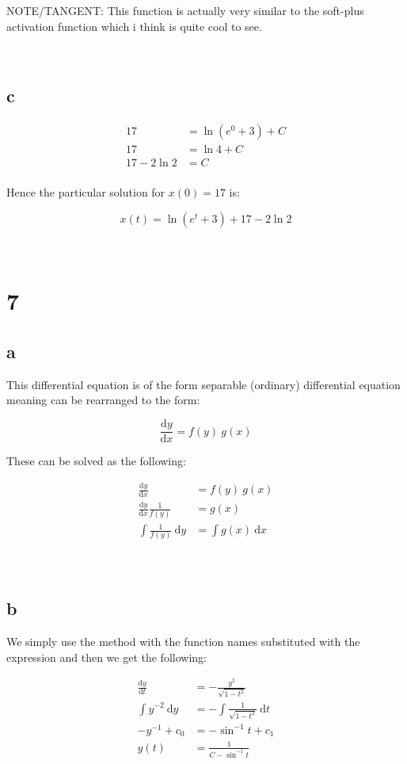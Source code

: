 \documentclass{article}
\newcommand{\md}{~\mathrm d}
\newcommand{\Md}{\mathrm d}
\newcommand{\blankpage}{
    \newpage
    \
    \newpage
}
\begin{document}
\begin{center}
    NOTE/TANGENT: This function is actually very similar to the soft-plus activation function which i think is quite cool to see.
\end{center}

\blankpage
\subsection{c}

\begin{align*}
    17 &= \ln (e^0 + 3) + C \\
    17 &= \ln 4 + C \\
    17 - 2\ln 2 &= C \\
\end{align*}

Hence the particular solution for $x(0) = 17$ is:

$$x(t) = \ln(e^t + 3) + 17 - 2 \ln 2$$

\blankpage
\section{7}
\subsection{a}

This differential equation is of the form separable (ordinary) differential equation meaning can be rearranged to the form:

$$\frac{\Md y}{\Md x} = f(y) ~ g(x)$$

These can be solved as the following:

\begin{align*}
    \frac{\Md y}{\Md x} &= f(y) ~ g(x) \\
    \frac{\Md y}{\Md x} \frac1{f(y)} &= g(x) \\
    \int \frac1{f(y)}\md y &= \int g(x) \md x \\
\end{align*}

\blankpage
\subsection{b}

We simply use the method with the function names substituted with the expression and then we get the following:

\begin{align*}
    \frac{\Md y}{\Md t} &= - \frac{y^2}{\sqrt{1 - t^2}} \\
    \int y ^{-2}\md y   &= - \int \frac1{\sqrt{1 - t^2}} \md t \\
    -y^{-1} + c_0       &= - \sin^{-1}t + c_1 \\
    y(t)                &= \frac1{C - \sin^{-1}t}
\end{align*}
\end{document}
